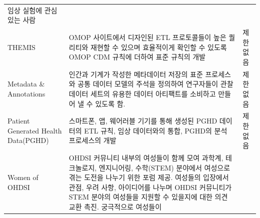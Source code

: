 \documentclass[11pt]{book}
\theoremstyle{definition}
\theoremstyle{definition}
\theoremstyle{definition}
\theoremstyle{remark}
\begin{document}
\begin{longtable}[]{@{}lll@{}}
\begin{minipage}[t]{0.37\columnwidth}
임상 실험에 관심 있는 사람\strut
\end{minipage}\tabularnewline
\begin{minipage}[t]{0.11\columnwidth}\raggedright\strut
THEMIS\strut
\end{minipage} & \begin{minipage}[t]{0.44\columnwidth}\raggedright\strut
OMOP 사이트에서 디자인된 ETL 프로토콜들이 높은 퀄리티와 재현할 수 있으며
효율적이게 확인할 수 있도록 OMOP CDM 규칙에 더하여 표준 규칙의
개발\strut
\end{minipage} & \begin{minipage}[t]{0.37\columnwidth}\raggedright\strut
제한 없음\strut
\end{minipage}\tabularnewline
\begin{minipage}[t]{0.11\columnwidth}\raggedright\strut
Metadata \& Annotations\strut
\end{minipage} & \begin{minipage}[t]{0.44\columnwidth}\raggedright\strut
인간과 기계가 작성한 메타데이터 저장의 표준 프로세스와 공통 데이터
모델의 주석을 정의하여 연구자들이 관찰 데이터 세트의 유용한 데이터
아티팩트를 소비하고 만들어 낼 수 있도록 함.\strut
\end{minipage} & \begin{minipage}[t]{0.37\columnwidth}\raggedright\strut
제한 없음\strut
\end{minipage}\tabularnewline
\begin{minipage}[t]{0.11\columnwidth}\raggedright\strut
Patient Generated Health Data(PGHD)\strut
\end{minipage} & \begin{minipage}[t]{0.44\columnwidth}\raggedright\strut
스마트폰, 앱, 웨어러블 기기를 통해 생성된 PGHD 데이터의 ETL 규칙, 임상
데이터와의 통합, PGHD의 분석 프로세스의 개발\strut
\end{minipage} & \begin{minipage}[t]{0.37\columnwidth}\raggedright\strut
제한 없음\strut
\end{minipage}\tabularnewline
\begin{minipage}[t]{0.11\columnwidth}\raggedright\strut
Women of OHDSI\strut
\end{minipage} & \begin{minipage}[t]{0.44\columnwidth}\raggedright\strut
OHDSI 커뮤니티 내부의 여성들이 함께 모여 과학계, 테크놀로지, 엔지니어링,
수학(STEM) 분야에서 여성으로 겪는 도전을 나누기 위한 포럼 제공. 여성들의
입장에서 관점, 우려 사항, 아이디어를 나누며 OHDSI 커뮤니티가 STEM 분야의
여성들을 지원할 수 있을지에 대한 의견 교환 촉진. 궁극적으로 여성들이

\end{minipage}
\end{longtable}
\end{document}
